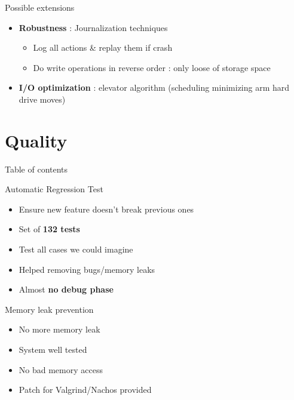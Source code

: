 \documentclass{beamer}
\begin{document}
\begin{frame}{Possible extensions}
    \begin{itemize}
        \item \textbf{Robustness} : Journalization techniques
            \begin{itemize}
                \item Log all actions \& replay them if crash
                \item Do write operations in reverse order : only loose of
                    storage space
            \end{itemize}
        \item \textbf{I/O optimization} : elevator algorithm (scheduling minimizing arm
            hard drive moves)
    \end{itemize}
\end{frame}

\section{Quality}
\begin{frame}{Table of contents}
    \tableofcontents[currentsection]
\end{frame}

\begin{frame}{Automatic Regression Test}
    \begin{itemize}
        \item Ensure new feature doesn't break previous ones
        \item Set of \textbf{132 tests}
        \item Test all cases we could imagine
        \item Helped removing bugs/memory leaks
        \item Almost \textbf{no debug phase}
    \end{itemize}
\end{frame}

\begin{frame}{Memory leak prevention}
    \begin{itemize}
        \item No more memory leak
        \item System well tested
        \item No bad memory access
        \item Patch for Valgrind/Nachos provided
    \end{itemize}
\end{frame}
\end{document}
